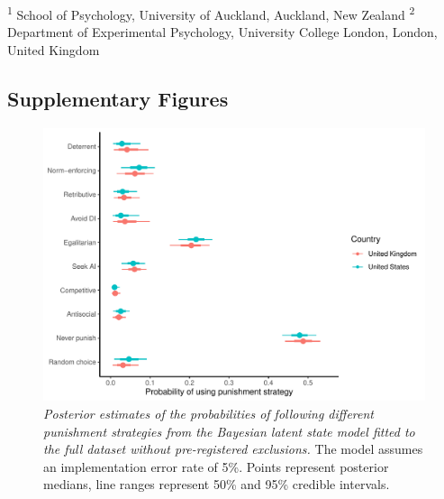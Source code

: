 \documentclass[
  man,floatsintext]{apa6}
\begin{document}
\raggedright

\noindent \footnotesize \textsuperscript{1} School of Psychology, University of Auckland, Auckland, New Zealand \newline
\noindent \footnotesize \textsuperscript{2} Department of Experimental Psychology, University College London, London, United Kingdom \newline
\normalsize
\newpage

\hypertarget{supplementary-figures}{%
\subsection{Supplementary Figures}\label{supplementary-figures}}







\begin{figure}
\centering
\includegraphics{manuscript_files/figure-latex/plotModel1a-1.pdf}
\caption{\label{fig:plotModel1a}\emph{Posterior estimates of the probabilities of following
different punishment strategies from the Bayesian latent state model fitted to
the full dataset without pre-registered exclusions.} The model assumes an
implementation error rate of 5\%. Points represent posterior medians, line ranges
represent 50\% and 95\% credible intervals.}
\end{figure}

\newpage
\end{document}
